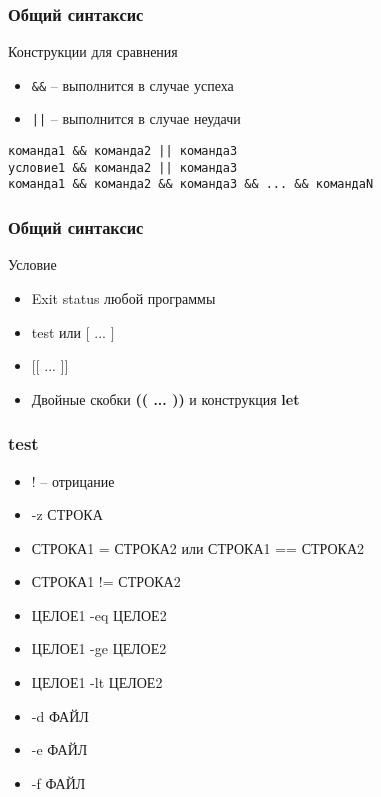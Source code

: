 \begin{frame}[fragile]
    \frametitle{Общий синтаксис}


	\begin{block}{Конструкции для сравнения}
		\begin{itemize}
			\item {\tt \&\&} -- выполнится в случае успеха
			\item {\tt ||} -- выполнится в случае неудачи
		\end{itemize}
	\end{block}

	\begin{verbatim}
команда1 && команда2 || команда3
условие1 && команда2 || команда3
команда1 && команда2 && команда3 && ... && командаN
	\end{verbatim}

\end{frame}

\begin{frame}
    \frametitle{Общий синтаксис}

	\begin{block}{Условие}
		\begin{itemize}
			\item Exit status любой программы
			\item test или $[$ ... $]$
			\item $[[$ ... $]]$
			\item Двойные скобки {\bf (( ... ))} и конструкция {\bf let}
		\end{itemize}
	\end{block}

\end{frame}


\begin{frame}[fragile]
\frametitle{test}

	\begin{itemize}
	    \item ! -- отрицание
	    \item -z СТРОКА
	    \item СТРОКА1 = СТРОКА2 или  СТРОКА1 == СТРОКА2 
	    \item СТРОКА1 != СТРОКА2
	    \item ЦЕЛОЕ1 -eq ЦЕЛОЕ2
	    \item ЦЕЛОЕ1 -ge ЦЕЛОЕ2
	    \item ЦЕЛОЕ1 -lt ЦЕЛОЕ2
	    \item -d ФАЙЛ
	    \item -e ФАЙЛ
	    \item -f ФАЙЛ
	\end{itemize}

\end{frame}


